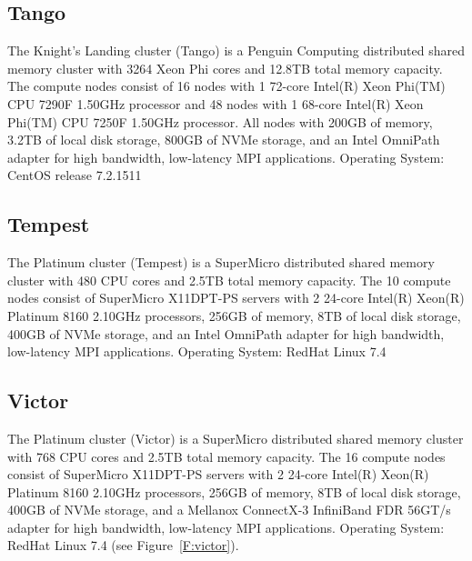 \subsection{Tango}

The Knight's Landing cluster (Tango) is a Penguin Computing
distributed shared memory cluster with 3264 Xeon Phi cores and 12.8TB
total memory capacity. The compute nodes consist of 16 nodes with 1
72-core Intel(R) Xeon Phi(TM) CPU 7290F 1.50GHz processor and 48 nodes
with 1 68-core Intel(R) Xeon Phi(TM) CPU 7250F 1.50GHz processor. All
nodes with 200GB of memory, 3.2TB of local disk storage, 800GB of NVMe
storage, and an Intel OmniPath adapter for high bandwidth, low-latency
MPI applications. Operating System: CentOS release 7.2.1511

\subsection{Tempest}

The Platinum cluster (Tempest) is a SuperMicro distributed shared
memory cluster with 480 CPU cores and 2.5TB total memory capacity. The
10 compute nodes consist of SuperMicro X11DPT-PS servers with 2
24-core Intel(R) Xeon(R) Platinum 8160 2.10GHz processors, 256GB of
memory, 8TB of local disk storage, 400GB of NVMe storage, and an Intel
OmniPath adapter for high bandwidth, low-latency MPI
applications. Operating System: RedHat Linux 7.4

\subsection{Victor}

The Platinum cluster (Victor) is a SuperMicro distributed shared
memory cluster with 768 CPU cores and 2.5TB total memory capacity. The
16 compute nodes consist of SuperMicro X11DPT-PS servers with 2
24-core Intel(R) Xeon(R) Platinum 8160 2.10GHz processors, 256GB of
memory, 8TB of local disk storage, 400GB of NVMe storage, and a
Mellanox ConnectX-3 InfiniBand FDR 56GT/s adapter for high bandwidth,
low-latency MPI applications. Operating System: RedHat Linux 7.4
(see Figure~\ref{F:victor}).

